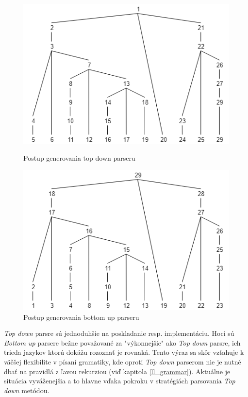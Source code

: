 \begin{figure}[H]
  \centering
  \begin{minipage}[b]{0.45\textwidth}
    \includegraphics[width=\textwidth]{figures/parseTreeExampleTopDown.png}
    \caption{Postup generovania top down parseru}
    \label{fig:parseTreeExampleTopDown}
  \end{minipage}
  \hfill
  \begin{minipage}[b]{0.45\textwidth}
    \includegraphics[width=\textwidth]{figures/parseTreeExampleBottomUp.png}
    \caption{Postup generovania bottom up parseru}
    \label{fig:parseTreeExampleBottomUp}
  \end{minipage}
\end{figure}

\textit{Top down} parsre sú jednoduhšie na poskladanie resp. implementáciu. Hoci sú \textit{Bottom up} parsere bežne považované za "výkonnejšie"{ }ako \textit{Top down} parsre, ich trieda jazykov ktorú dokážu rozoznať je rovnaká\cite{aho1972theory}. Tento výraz sa skôr vzťahuje k väčšej flexibilite v písaní gramatiky, kde oproti \textit{Top down} parserom nie je nutné dbať na pravidlá z ľavou rekurziou (viď kapitola \ref{ll_grammar}). Aktuálne je situácia vyváženejšia a to hlavne vďaka pokroku v stratégiách parsovania \textit{Top down} metódou. 

